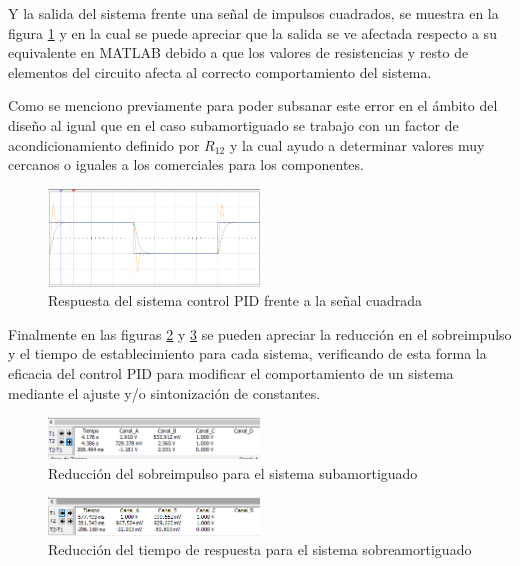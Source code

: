 \documentclass[conference]{IEEEtran}
\begin{document}
	Y la salida del sistema frente una señal de impulsos cuadrados, se muestra en la figura \ref{fig:respuesta-circuito-sobre} y en la cual se puede apreciar que la salida se ve afectada respecto a su equivalente en MATLAB debido a que los valores de resistencias y resto de elementos del circuito afecta al correcto comportamiento del sistema.
	
	Como se menciono previamente para poder subsanar este error en el ámbito del diseño al igual que en el caso subamortiguado se trabajo con un factor de acondicionamiento definido por $R_12$ y la cual ayudo a determinar valores muy cercanos o iguales a los comerciales para los componentes.
	
	
	\begin{figure}[h]
		\centering
		\includegraphics[width=0.5\textwidth]{media1/respuesta-circuito-sobre}
		\caption{Respuesta del sistema control PID frente a la señal cuadrada}
		\label{fig:respuesta-circuito-sobre}
	\end{figure}
	
	Finalmente en las figuras \ref{fig:salida-subamor} y \ref{fig:salida-sobreamor} se pueden apreciar la reducción en el sobreimpulso y el tiempo de establecimiento para cada sistema, verificando de esta forma la eficacia del control PID para modificar el comportamiento de un sistema mediante el ajuste y/o sintonización de constantes.
	
	\begin{figure}[h]
		\centering
		\includegraphics[width=0.5\textwidth]{media1/salida-subamor}
		\caption{Reducción del sobreimpulso para el sistema subamortiguado}
		\label{fig:salida-subamor}
	\end{figure}
	
	\begin{figure}[h]
		\centering
		\includegraphics[width=0.5\textwidth]{media1/salida-sobreamor}
		\caption{Reducción del tiempo de respuesta para el sistema sobreamortiguado}
		\label{fig:salida-sobreamor}
	\end{figure}
	
	
\end{document}

